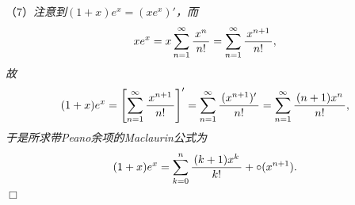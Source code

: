 \begin{frame}
	\linespread{1.5}
	
	
	\small （7）\it 注意到$(1+x)e^x=(xe^x)'$，而
	$$xe^x=x\sumn\df{x^n}{n!}=\sumn\df{x^{n+1}}{n!},$$
	故
	$$(1+x)e^x=\left[\sumn\df{x^{n+1}}{n!}\right]'
	=\sumn\df{(x^{n+1})'}{n!}
	=\sumn\df{(n+1)x^n}{n!},$$
	于是所求带Peano余项的Maclaurin公式为
	$$(1+x)e^x=\sum\limits_{k=0}^n\df{(k+1)x^k}{k!}+\circ(x^{n+1}).$$
	\hfill$\Box$
\end{frame}